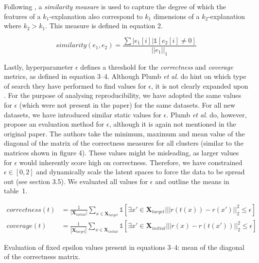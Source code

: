 Following \cite[p.~6]{plumb2020explaining}, a \textit{similarity measure} is used to capture the degree of which the features of a $k_1$-explanation also correspond to $k_1$ dimensions of a $k_2$-explanation where $k_2 > k_1$. This measure is defined in equation 2. 

\begin{equation}
similarity(e_1, e_2) = \frac{\sum|e_1[i]|\mathbb{1}[e_2[i] \neq 0]}{||e_1||_1}
\end{equation}

Lastly, hyperparameter $\epsilon$ defines a threshold for the \textit{correctness} and \textit{coverage} metrics, as defined in equation 3--4. Although Plumb \textit{et al}. do hint on which type of search they have performed to find values for $\epsilon$, it is not clearly expanded upon \cite[p.~4]{plumb2020explaining}. For the purpose of analysing reproducibility, we have adopted the same values for $\epsilon$ (which were not present in the paper) for the same datasets. For all new datasets, we have introduced similar static values for $\epsilon$. Plumb \textit{et al}. do, however, propose an evaluation method for $\epsilon$, although it is again not mentioned in the original paper. The authors take the minimum, maximum and mean value of the diagonal of the matrix of the correctness measures for all clusters (similar to the matrices shown in figure 4). These values might be misleading, as larger values for $\epsilon$ would inherently score high on correctness. Therefore, we have constrained $\epsilon \in [0, 2]$ and dynamically scale the latent spaces to force the data to be spread out (see section 3.5). We evaluated all values for $\epsilon$ and outline the means in table~1.

\begin{align}
correctness(t) &= \frac{1}{|\boldsymbol{X}_{initial}|} \sum\limits_{x \in \boldsymbol{X}_{target}} \mathbb{1} [\exists x' \in \boldsymbol{X}_{target} | || r(t(x)) - r(x')||^2_2 \leq \epsilon]\\
coverage(t) &= \frac{1}{|\boldsymbol{X}_{target}|} \sum\limits_{x \in \boldsymbol{X}_{initial}} \mathbb{1} [\exists x' \in \boldsymbol{X}_{initial} | || r(x) - r(t(x'))||^2_2 \leq \epsilon]
\end{align}

\begin{table}[h]
  \centering
  
  \caption{Evaluation of fixed epsilon values present in equations 3--4: mean of the diagonal of the correctness matrix.}
\end{table}

